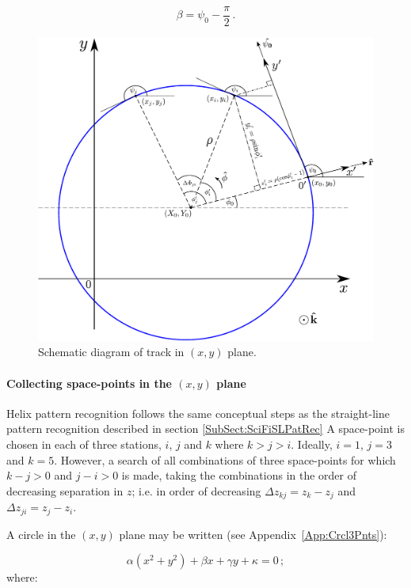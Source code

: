 \begin{equation}
  \beta = \psi_0 - \frac{\pi}{2} \, .
\end{equation}
\begin{figure}
  \begin{center}
    \includegraphics[width=0.85\linewidth]{detectors/tracker/04-Reconstruction/04-03-Pattern-recognition/Figures/Track-model.pdf}
  \end{center}
  \caption{Schematic diagram of track in $(x, y)$ plane.}
  \label{Fig:PatRecTrkMdl}
\end{figure}

\paragraph{Collecting space-points in the $(x, y)$ plane}

Helix pattern recognition follows the same conceptual steps as the straight-line pattern recognition described in section \ref{SubSect:SciFiSLPatRec} A space-point is chosen in each of three stations, $i$, $j$ and $k$ where $k>j>i$. Ideally, $i=1$, $j=3$ and $k=5$. However, a search of all combinations of three space-points for which $k-j>0$ and $j-i>0$ is made, taking the combinations in the order of decreasing separation in $z$; i.e. in order of decreasing $\Delta z_{kj} = z_k - z_j$ and $\Delta z_{ji} = z_j - z_i$. 

A circle in the $(x, y)$ plane may be written (see Appendix~\ref{App:Crcl3Pnts}):

\begin{equation}
  \alpha(x^2+y^2) + \beta x + \gamma y + \kappa = 0 \, ;
  \label{Eq:HPRCrclPrm}
\end{equation}
where:

